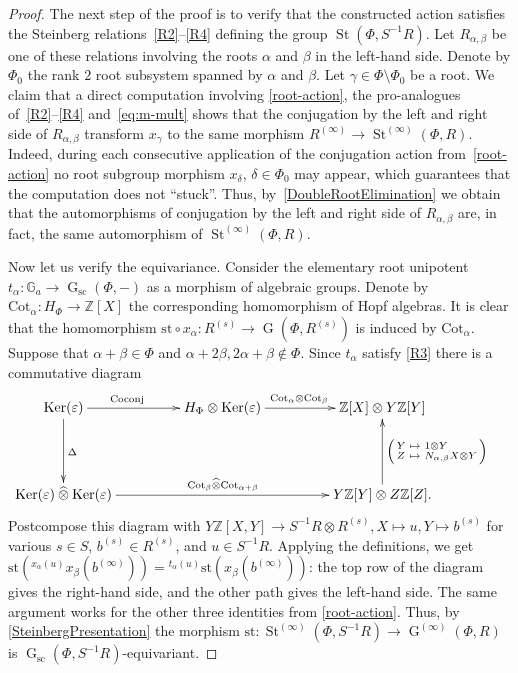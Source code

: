 \documentclass[oneside, 11pt]{amsart}
\numberwithin{equation}{section}
\theoremstyle{definition}
\theoremstyle{remark}
\DeclareMathOperator\St{St}
\DeclareMathOperator\Ker{Ker}
\DeclareMathOperator\GG{G}
\newcommand{\otimeshat}{\mathbin{\widehat{\otimes}}}
\newcommand{\up}[2]{{^{#1}\!{#2}}}
\begin{document}
\begin{proof}
 The next step of the proof is to verify that the constructed action satisfies the Steinberg relations~\eqref{R2}--\eqref{R4} defining the group $\St(\Phi, S^{-1}R)$.
 Let $R_{\alpha, \beta}$ be one of these relations involving the roots $\alpha$ and $\beta$ in the left-hand side. Denote by $\Phi_0$ the rank $2$ root subsystem spanned by $\alpha$ and $\beta$. Let $\gamma \in \Phi\setminus \Phi_0$ be a root. We claim that a direct computation involving \cref{root-action}, the pro-analogues of~\eqref{R2}--\eqref{R4} and~\eqref{eq:m-mult} shows that the conjugation by the left and right side of $R_{\alpha, \beta}$ transform $x_\gamma$ to the same morphism $R^{(\infty)} \to \St^{(\infty)}(\Phi, R)$.
 Indeed, during each consecutive application of the conjugation action from~\cref{root-action} no root subgroup morphism $x_\delta$, $\delta \in \Phi_0$ may appear, which guarantees that the computation does not ``stuck''. Thus, by~\cref{DoubleRootElimination} we obtain that the automorphisms of conjugation by the left and right side of $R_{\alpha,\beta}$ are, in fact, the same automorphism of $\St^{(\infty)}(\Phi, R)$.
 
 Now let us verify the equivariance. 
 Consider the elementary root unipotent \(t_\alpha \colon \mathbb{G}_a \to \GG_{\mathrm{sc}}(\Phi, -)\) as a morphism of algebraic groups.
 Denote by \(\mathrm{Cot}_\alpha \colon H_\Phi \to \mathbb Z[X]\) the corresponding homomorphism of Hopf algebras. It is clear that the homomorphism \(\mathrm{st} \circ x_\alpha \colon R^{(s)} \to \GG(\Phi, R^{(s)})\) is induced by \(\mathrm{Cot}_\alpha\).
 Suppose that \(\alpha + \beta \in \Phi\) and \(\alpha + 2\beta, 2\alpha + \beta \notin \Phi\).
 Since $t_\alpha$ satisfy \eqref{R3} there is a commutative diagram
 \[\xymatrix@+1.8pc{
 \Ker(\varepsilon) \ar[r]^(.4){\mathrm{Coconj}} \ar[d]^{\Delta} &
 H_\Phi \otimes \Ker(\varepsilon) \ar[r]^(0.48){\mathrm{Cot}_\alpha \otimes \mathrm{Cot}_\beta} &
 \mathbb Z[X] \otimes Y \mathbb Z[Y]\\
 \Ker(\varepsilon) \otimeshat \Ker(\varepsilon) \ar[rr]^{\mathrm{Cot}_\beta \otimeshat \mathrm{Cot}_{\alpha + \beta}} &&
 Y \mathbb Z[Y] \otimes Z \mathbb Z[Z]. \ar[u]_{\begin{psmallmatrix*}[l] Y & \mapsto & 1 \otimes Y\\ Z & \mapsto & N_{\alpha,\beta} X \otimes Y \end{psmallmatrix*}} &
 }\]
 Postcompose this diagram with \(Y \mathbb Z[X, Y] \to S^{-1} R \otimes R^{(s)}, X \mapsto u, Y \mapsto b^{(s)}\) for various \(s \in S\), \(b^{(s)} \in R^{(s)}\), and \(u \in S^{-1} R\). Applying the definitions, we get \(\mathrm{st}(\up{x_\alpha(u)}{x_\beta(b^{(\infty)})}) = \up{t_\alpha(u)}{\mathrm{st}(x_\beta(b^{(\infty)}))}\): the top row of the diagram gives the right-hand side, and the other path gives the left-hand side. The same argument works for the other three identities from \cref{root-action}. Thus, by \cref{SteinbergPresentation} the morphism \(\mathrm{st} \colon \St^{(\infty)}(\Phi, S^{-1} R) \to \GG^{(\infty)}(\Phi, R)\) is \(\GG_{\mathrm{sc}}(\Phi, S^{-1} R)\)-equivariant.


\end{proof}
\end{document}
